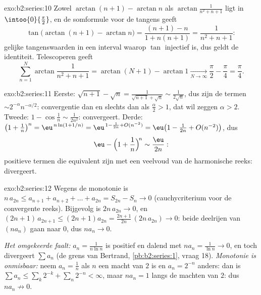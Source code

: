 \begin{solution}{exo:b2:series:10}
Zowel $\arctan(n+1) - \arctan n$ als $\arctan\frac{1}{n^2+n+1}$
ligt in $\intoo{0}{\frac\pi2}$, en de somformule voor de tangens
geeft
\[
\tan\bigl(\arctan(n{+}1) - \arctan n\bigr)
= \frac{(n+1) - n}{1 + n(n+1)} = \frac{1}{n^2 + n + 1} :
\]
gelijke tangenswaarden in een interval waarop $\tan$ injectief is,
dus geldt de identiteit. Telescoperen geeft
\[
\sum_{n=1}^{N}\arctan\frac{1}{n^2+n+1}
= \arctan(N{+}1) - \arctan 1 \xrightarrow[N\to\infty]{}
\frac\pi2 - \frac\pi4 = \frac\pi4 .
\]

\end{solution}

\begin{solution}{exo:b2:series:11}
Eerste: $\sqrt{n+1} - \sqrt n = \frac{1}{\sqrt{n+1} + \sqrt n} \sim
\frac{1}{2\sqrt n}$, dus zijn de termen $\sim
2^{-\alpha}n^{-\alpha/2}$: convergentie dan en slechts dan als
$\frac\alpha2 > 1$, dat wil zeggen $\alpha > 2$. Tweede: $1 -
\cos\frac1n \sim \frac{1}{2n^2}$: convergeert. Derde: $\bigl(1 +
\frac1n\bigr)^n = \eu^{\,n\ln(1 + 1/n)} = \eu^{\,1 - \frac1{2n} +
O(n^{-2})} = \eu\bigl(1 - \frac{1}{2n} + O(n^{-2})\bigr)$, dus
\[
\eu - \Bigl(1 + \frac1n\Bigr)^{\!n} \sim \frac{\eu}{2n} :
\]
positieve termen die equivalent zijn met een veelvoud van de
harmonische reeks: divergeert.
\end{solution}

\begin{solution}{exo:b2:series:12}
Wegens de monotonie is $n\,a_{2n} \leq a_{n+1} + a_{n+2} + \dots +
a_{2n} = S_{2n} - S_n \to 0$ (cauchycriterium voor de convergente
reeks). Bijgevolg is $2n\,a_{2n} \to 0$, en $(2n{+}1)\,a_{2n+1}
\leq (2n{+}1)a_{2n} = \frac{2n+1}{2n}\,(2n\,a_{2n}) \to 0$: beide
deelrijen van $(na_n)$ gaan naar $0$, dus $na_n \to 0$.

\emph{Het omgekeerde faalt:} $a_n = \frac1{n\ln n}$ is positief en
dalend met $na_n = \frac1{\ln n} \to 0$, en toch divergeert $\sum
a_n$ (de grens van Bertrand, \cref{pb:b2:series:1}, vraag 18).
\emph{Monotonie is onmisbaar:} neem $a_n = \frac1n$ als $n$ een
macht van $2$ is en $a_n = 2^{-n}$ anders: dan is $\sum a_n \leq
\sum_k 2^{-k} + \sum_n 2^{-n} < \infty$, maar $na_n = 1$ langs de
machten van $2$: dus $na_n \not\to 0$.
\end{solution}

